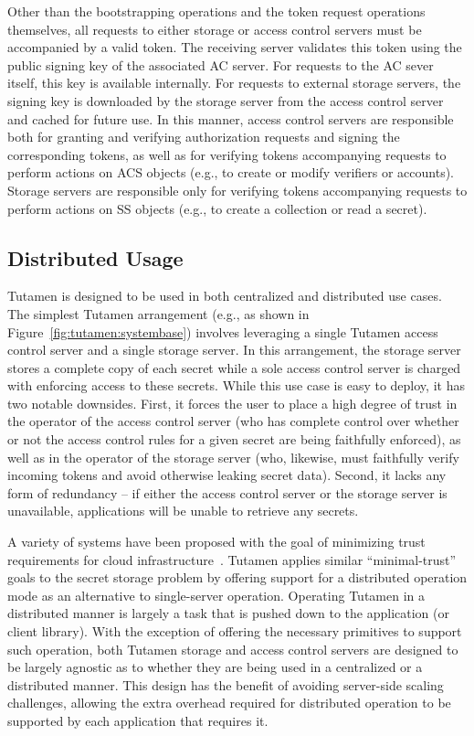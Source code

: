Other than the bootstrapping operations and the token request
operations themselves, all requests to either storage or access
control servers must be accompanied by a valid token. The receiving
server validates this token using the public signing key of the
associated AC server. For requests to the AC sever itself, this key is
available internally. For requests to external storage servers, the
signing key is downloaded by the storage server from the access
control server and cached for future use. In this manner, access
control servers are responsible both for granting and verifying
authorization requests and signing the corresponding tokens, as well
as for verifying tokens accompanying requests to perform actions on
ACS objects (e.g., to create or modify verifiers or accounts). Storage
servers are responsible only for verifying tokens accompanying
requests to perform actions on SS objects (e.g., to create a
collection or read a secret).

\subsection{Distributed Usage}
\label{chap:tutamen:arch:distributed}

Tutamen is designed to be used in both centralized and distributed use
cases. The simplest Tutamen arrangement (e.g., as shown in
Figure~\ref{fig:tutamen:systembase}) involves leveraging a single
Tutamen access control server and a single storage server. In this
arrangement, the storage server stores a complete copy of each secret
while a sole access control server is charged with enforcing access to
these secrets. While this use case is easy to deploy, it has two
notable downsides. First, it forces the user to place a high degree of
trust in the operator of the access control server (who has complete
control over whether or not the access control rules for a given
secret are being faithfully enforced), as well as in the operator of
the storage server (who, likewise, must faithfully verify incoming
tokens and avoid otherwise leaking secret data). Second, it lacks any
form of redundancy -- if either the access control server or the
storage server is unavailable, applications will be unable to retrieve
any secrets.

A variety of systems have been proposed with the goal of minimizing
trust requirements for cloud infrastructure~\cite{bessani2011,
  kallahalla2003, kubiatowicz2000, mahajan2011,
  wilcox-o'hearn2008}. Tutamen applies similar ``minimal-trust'' goals
to the secret storage problem by offering support for a distributed
operation mode as an alternative to single-server operation. Operating
Tutamen in a distributed manner is largely a task that is pushed down
to the application (or client library). With the exception of offering
the necessary primitives to support such operation, both Tutamen
storage and access control servers are designed to be largely agnostic
as to whether they are being used in a centralized or a distributed
manner. This design has the benefit of avoiding server-side scaling
challenges, allowing the extra overhead required for distributed
operation to be supported by each application that requires it.

